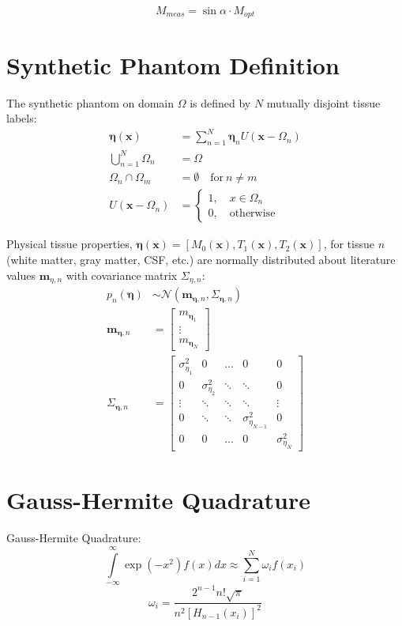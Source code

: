 \documentclass{article}         %
\theoremstyle{definition}
\theoremstyle{remark}
\newcommand{\eq}[1]{\begin{equation} #1 \end{equation}}
\newcommand{\eqsp}[1]{\begin{equation}\begin{split} #1 \end{split}\end{equation}}
\newcommand{\bracket}[1]{\left[#1\right]}
\newcommand{\arr}[2]{\begin{array}{#1} #2 \end{array}}
\newcommand{\brkarray}[2]{\bracket{\arr{#1}{#2}}}
\begin{document}
\eq{M_{meas}=\sin\alpha\cdot M_{opt}}

\section{Synthetic Phantom Definition}\label{synphan}

The synthetic phantom on domain $\Omega$ is defined by $N$ mutually disjoint tissue labels:
\eqsp{\mathbf{\eta}(\mathbf{x})&=\sum\limits_{n=1}^{N}\mathbf{\eta}_n U(\mathbf{x}-\Omega_n)\\
\bigcup\limits_{n=1}^{N}\Omega_n&=\Omega\\
\Omega_n\cap\Omega_m&=\emptyset\quad\mathrm{for\ }n\ne m\\
U(\mathbf{x}-\Omega_n)&=\left\{\arr{l}{1,\quad x\in\Omega_n \\ 0,\quad\mathrm{otherwise}}\right.}

Physical tissue properties, $\mathbf{\eta}(\mathbf{x})=[M_0(\mathbf{x}),T_1(\mathbf{x}),T_2(\mathbf{x})]$, for tissue $n$ (white matter, gray matter, CSF, etc.) are normally distributed about literature values $\mathbf{m}_{\eta,n}$ with covariance matrix $\Sigma_{\eta,n}$:
\eqsp{p_n(\mathbf{\eta})&\sim\mathcal{N}(\mathbf{m}_{\mathbf{\eta},n},\Sigma_{\mathbf{\eta},n})\\
\mathbf{m}_{\mathbf{\eta},n}&=\brkarray{c}{m_{\mathbf{\eta}_1} \\ \vdots \\ m_{\mathbf{\eta}_N}}\\
\Sigma_{\mathbf{\eta},n}&=\brkarray{ccccc}{\sigma_{\eta_1}^2 & 0 & \hdots & 0 & 0 \\
											0 & \sigma_{\eta_2}^2 & \ddots & \ddots & 0 \\
											\vdots & \ddots & \ddots & \ddots & \vdots \\
											0 & \ddots & \ddots & \sigma_{\eta_{N-1}}^2 & 0 \\
											0 & 0 & \hdots & 0 & \sigma_{\eta_N}^2}}

\section{Gauss-Hermite Quadrature}

Gauss-Hermite Quadrature:
\eq{\int\limits_{-\infty}^{\infty}\exp(-x^2)f(x)dx\approx\sum\limits_{i=1}^{N}\omega_i f(x_i)}
\eq{\omega_i=\frac{2^{n-1}n!\sqrt{\pi}}{n^2[H_{n-1}(x_i)]^2}}
\end{document}
